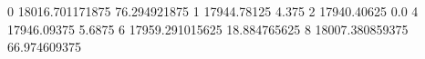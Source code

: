 0 18016.701171875 76.294921875
1 17944.78125 4.375
2 17940.40625 0.0
4 17946.09375 5.6875
6 17959.291015625 18.884765625
8 18007.380859375 66.974609375
